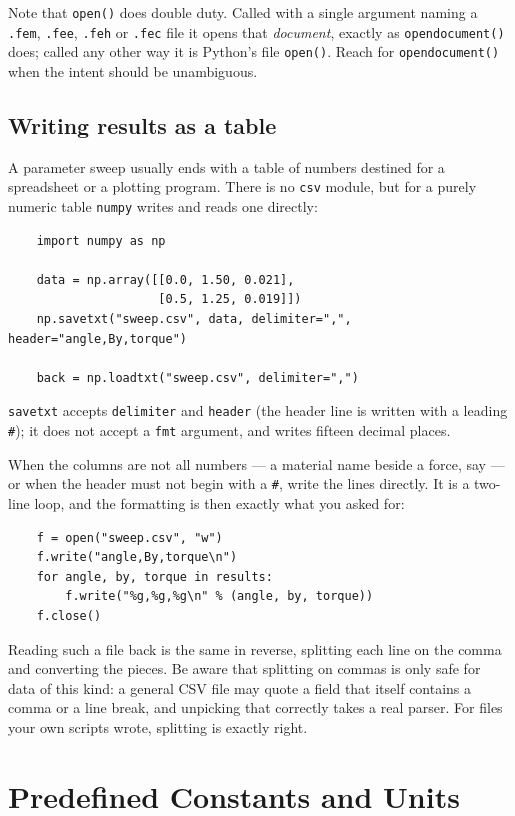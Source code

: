 Note that {\tt open()} does double duty.  Called with a single argument
naming a {\tt .fem}, {\tt .fee}, {\tt .feh} or {\tt .fec} file it opens
that {\em document}, exactly as {\tt opendocument()} does; called any
other way it is Python's file {\tt open()}.  Reach for
{\tt opendocument()} when the intent should be unambiguous.

\subsection*{Writing results as a table}

A parameter sweep usually ends with a table of numbers destined for a
spreadsheet or a plotting program.  There is no {\tt csv} module, but for a
purely numeric table {\tt numpy} writes and reads one directly:

\begin{verbatim}
    import numpy as np

    data = np.array([[0.0, 1.50, 0.021],
                     [0.5, 1.25, 0.019]])
    np.savetxt("sweep.csv", data, delimiter=",", header="angle,By,torque")

    back = np.loadtxt("sweep.csv", delimiter=",")
\end{verbatim}

{\tt savetxt} accepts {\tt delimiter} and {\tt header} (the header line is
written with a leading {\tt \#}); it does not accept a {\tt fmt} argument,
and writes fifteen decimal places.

When the columns are not all numbers --- a material name beside a force, say
--- or when the header must not begin with a {\tt \#}, write the lines
directly.  It is a two-line loop, and the formatting is then exactly what
you asked for:

\begin{verbatim}
    f = open("sweep.csv", "w")
    f.write("angle,By,torque\n")
    for angle, by, torque in results:
        f.write("%g,%g,%g\n" % (angle, by, torque))
    f.close()
\end{verbatim}

Reading such a file back is the same in reverse, splitting each line on the
comma and converting the pieces.  Be aware that splitting on commas is only
safe for data of this kind: a general CSV file may quote a field that itself
contains a comma or a line break, and unpicking that correctly takes a real
parser.  For files your own scripts wrote, splitting is exactly right.

\section{Predefined Constants and Units}

